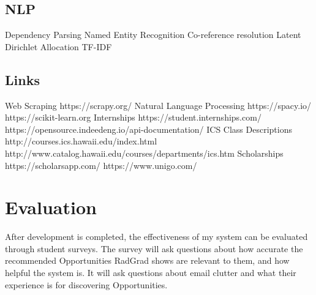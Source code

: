 \documentclass[english]{proposalnsf}
\begin{document}
	
	
	\subsection{NLP}
	\begin{outline}
		\1 Dependency Parsing
		\1 Named Entity Recognition
		\1 Co-reference resolution
		\1 Latent Dirichlet Allocation
		\1 TF-IDF
	\end{outline}
	
	
	\subsection{Links}
	\begin{outline}
		\1 Web Scraping
		\2 https://scrapy.org/
		\1 Natural Language Processing
		\2 https://spacy.io/
		\2 https://scikit-learn.org
		\1 Internships
		\2 https://student.internships.com/
		\2 https://opensource.indeedeng.io/api-documentation/
		\1 ICS Class Descriptions
		\2 http://courses.ics.hawaii.edu/index.html
		\2 http://www.catalog.hawaii.edu/courses/departments/ics.htm
		\1 Scholarships
		\2 https://scholarsapp.com/
		\2 https://www.unigo.com/
	\end{outline}
	
	
	\section{Evaluation}
	\label{evaluation}
	After development is completed, the effectiveness of my system can be evaluated through student surveys. The survey will ask questions about how accurate the recommended Opportunities RadGrad shows are relevant to them, and how helpful the system is. It will ask questions about email clutter and what their experience is for discovering Opportunities.
	
	
\end{document}

